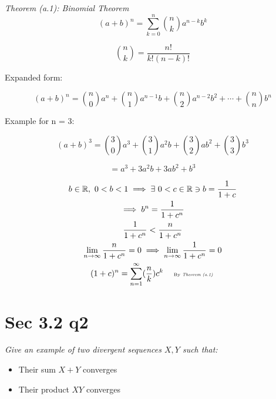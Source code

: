 \documentclass[11pt]{article}
\newcommand{\question}[1]{
    \begin{mdframed}[
        linecolor=gray,       %
        linewidth=0.5pt,      %
        innertopmargin=10pt,  %
        innerbottommargin=10pt %
    ]
    \centering \itshape #1
    \end{mdframed}
}
\newcommand{\subp}[1]{
    \begin{mdframed}[
        linewidth=0.5pt,      %
        innertopmargin=10pt,  %
        innerbottommargin=10pt %
    ]
    \centering \itshape #1
    \end{mdframed}
}
\theoremstyle{plain}
\begin{document}
\subp{
Theorem (a.1): Binomial Theorem
\[ (a+b)^n = \sum_{k=0}^{n} \binom{n}{k} a^{n-k} b^{k} \]

\[ \binom{n}{k} = \frac{n!}{k!(n-k)!} \]

Expanded form:

\[
	(a+b)^n =
	\binom{n}{0}a^n
	+ \binom{n}{1}a^{n-1}b
	+ \binom{n}{2}a^{n-2}b^2
	+ \cdots
	+ \binom{n}{n}b^n
\]

Example for n = 3:

\[
	(a+b)^3 =
	\binom{3}{0}a^3
	+ \binom{3}{1}a^2b
	+ \binom{3}{2}ab^2
	+ \binom{3}{3}b^3
\]

\[ = a^3 + 3a^2b + 3ab^2 + b^3 \]
}

\[
	\begin{gathered}
		b \in \mathbb{R}, ~0<b<1 \implies \exists ~0<c \in \mathbb{R}  \ni b = \frac{1}{1+c} \\
		\implies b^n = \frac{1}{1+c^n} \\
		\frac{1}{1+c^n} < \frac{n}{1+c^n}  \\
		\lim_{n \to \infty} \frac{n}{1+c^n} = 0 \implies \lim_{n \to \infty} \frac{1}{1+c^n} = 0 \\
		(1+c)^n = \sum_{n=1}^{\infty} (\frac{n}{k}) c^k \quad  \tiny{\text{ By \textit{Theorem (a.1)} }}
	\end{gathered}
\]
\section*{ Sec 3.2 q2}
\question{
	Give an example of two divergent sequences $X,Y$ such that:
	\begin{itemize}
		\item Their sum $X+Y$ converges
		\item Their product $XY$ converges
	\end{itemize}
}
\end{document}
